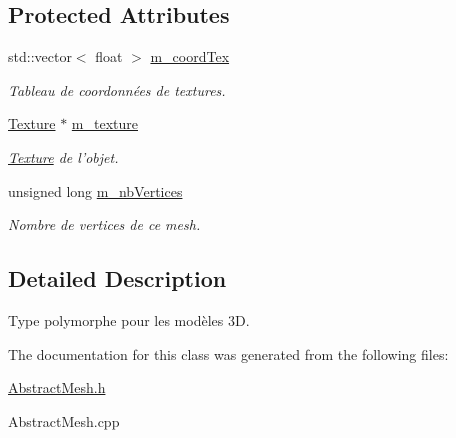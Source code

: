 \subsection*{Protected Attributes}
\begin{DoxyCompactItemize}
\item 
\hypertarget{classAbstractMesh_a15e43124d601085e1495c738a657c826}{std\-::vector$<$ float $>$ \hyperlink{classAbstractMesh_a15e43124d601085e1495c738a657c826}{m\-\_\-coord\-Tex}}\label{classAbstractMesh_a15e43124d601085e1495c738a657c826}

\begin{DoxyCompactList}\small\item\em Tableau de coordonnées de textures. \end{DoxyCompactList}\item 
\hypertarget{classAbstractMesh_a0bcd16f81880e90b11781bb61af294cf}{\hyperlink{classTexture}{Texture} $\ast$ \hyperlink{classAbstractMesh_a0bcd16f81880e90b11781bb61af294cf}{m\-\_\-texture}}\label{classAbstractMesh_a0bcd16f81880e90b11781bb61af294cf}

\begin{DoxyCompactList}\small\item\em \hyperlink{classTexture}{Texture} de l'objet. \end{DoxyCompactList}\item 
\hypertarget{classAbstractMesh_a07951f17a49c5a02a895ca6cbdd3b0c5}{unsigned long \hyperlink{classAbstractMesh_a07951f17a49c5a02a895ca6cbdd3b0c5}{m\-\_\-nb\-Vertices}}\label{classAbstractMesh_a07951f17a49c5a02a895ca6cbdd3b0c5}

\begin{DoxyCompactList}\small\item\em Nombre de vertices de ce mesh. \end{DoxyCompactList}\end{DoxyCompactItemize}


\subsection{Detailed Description}
Type polymorphe pour les modèles 3\-D. 

The documentation for this class was generated from the following files\-:\begin{DoxyCompactItemize}
\item 
\hyperlink{AbstractMesh_8h}{Abstract\-Mesh.\-h}\item 
Abstract\-Mesh.\-cpp\end{DoxyCompactItemize}

